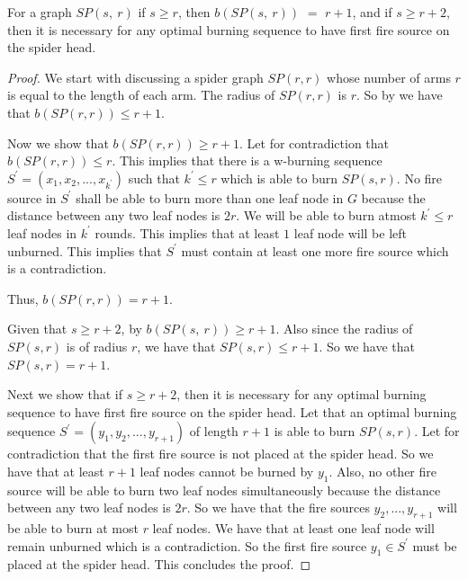 \begin{lemma}\label{lemma:b(SP)}
    For a graph $SP(s,\ r)$ if $s \geq r$, then $b(SP(s,\ r))$ $=$ $r+1$, and if $s \geq r+2$, then it is necessary for any optimal burning sequence to have first fire source on the spider head.
\end{lemma}

\begin{proof}
    We start with discussing a spider graph $SP(r,r)$ whose number of arms $r$ is equal to the length of each arm. The radius of $SP(r,r)$ is $r$. So by  we have that $b(SP(r,r))\leq r+1$.
    
    Now we show that $b(SP(r,r))\geq r+1$.
    Let for contradiction that $b(SP(r,r))\leq r$. This implies that there is a w-burning sequence $S^\prime=(x_1,x_2,...,x_{k^\prime})$ such that $k^\prime\leq r$ which is able to burn $SP(s,r)$. No fire source in $S^\prime$ shall be able to burn more than one leaf node in $G$ because the distance between any two leaf nodes is $2r$. We will be able to burn atmost $k^\prime \leq r$ leaf nodes in $k^\prime$ rounds. This implies that at least $1$ leaf node will be left unburned. This implies that $S^\prime$ must contain at least one more fire source which is a contradiction.
    
    Thus, $b(SP(r,r))=r+1$.
    
    Given that $s \geq r+2$, by  $b(SP(s,\ r))\geq r+1$. Also since the radius of $SP(s,r)$ is of radius $r$, we have that $SP(s,r)\leq r+1$. So we have that $SP(s,r)=r+1$.
    
    Next we show that if $s \geq r+2$, then it is necessary for any optimal burning sequence to have first fire source on the spider head. Let that an optimal burning sequence $S^\prime=(y_1,y_2,...,y_{r+1})$ of length $r+1$ is able to burn $SP(s,r)$. Let for contradiction that the first fire source is not placed at the spider head. So we have that at least $r+1$ leaf nodes cannot be burned by $y_1$. Also, no other fire source will be able to burn two leaf nodes simultaneously because the distance between any two leaf nodes is $2r$. So we have that the fire sources $y_2,...,y_{r+1}$ will be able to burn at most $r$ leaf nodes. We have that at least one leaf node will remain unburned which is a contradiction. So the first fire source $y_1\in S^\prime$ must be placed at the spider head. This concludes the proof.
\end{proof}

